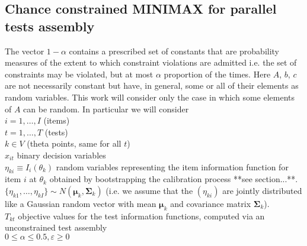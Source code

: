 \subsection{Chance constrained MINIMAX for parallel tests assembly}
The vector $1-\alpha$ contains a prescribed set of constants that are probability measures of the extent to which constraint violations are admitted i.e. the set of constraints may be violated, but at most $\alpha$ proportion of the times.
Here $A$, $b$, $c$ are not necessarily constant but have, in general, some or all of their elements as random variables. This work will consider only the case in which some elements of $A$ can be random.
In particular we will consider \\
$i=1,\ldots,I$ (items) \\
$t=1,\ldots,T$ (tests) \\
$k \in V$ (theta points, same for all $t$) \\
$x_{it}$ binary decision variables \\
$\eta_{ki}\equiv I_i(\theta_k)$ random variables representing the item information function for item $i$ at $\theta_k$ obtained by bootstrapping the calibration process **see section...**.  \\


$\{ \eta_{k1}, \ldots,\eta_{kI} \} \sim N(\boldsymbol{\mu}_k,\boldsymbol{\Sigma}_k)$ (i.e. we assume that the $\left( \eta_{ki} \right) $ are jointly distributed like a Gaussian random vector with mean $\boldsymbol{\mu}_k$ and covariance matrix $\boldsymbol{\Sigma}_k$).\\
$T_{kt} $ objective values for the test information functions, computed via an unconstrained test assembly \\
$0 \leq \alpha \leq 0.5, \varepsilon \geq 0$ \\

